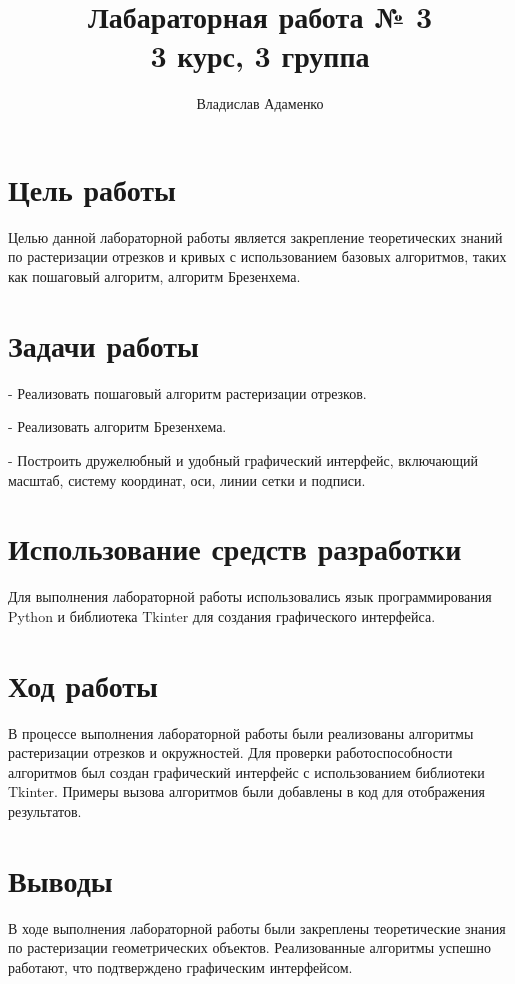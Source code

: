 \documentclass{article}
\begin{document}
    \title{Лабараторная работа № 3\\ 3 курс, 3 группа}
    \author{Владислав Адаменко}
    \maketitle

    \section{Цель работы}
    Целью данной лабораторной работы является закрепление теоретических знаний по растеризации отрезков и кривых с использованием базовых алгоритмов, таких как пошаговый алгоритм, алгоритм Брезенхема.

    \section{Задачи работы}
    - Реализовать пошаговый алгоритм растеризации отрезков.

    - Реализовать алгоритм Брезенхема.

    - Построить дружелюбный и удобный графический интерфейс, включающий масштаб, систему координат, оси, линии сетки и подписи.

    \section{Использование средств разработки}
    Для выполнения лабораторной работы использовались язык программирования Python и библиотека Tkinter для создания графического интерфейса.

    \section{Ход работы}
    В процессе выполнения лабораторной работы были реализованы алгоритмы растеризации отрезков и окружностей. Для проверки работоспособности алгоритмов был создан графический интерфейс с использованием библиотеки Tkinter. Примеры вызова алгоритмов были добавлены в код для отображения результатов.

    \section{Выводы}
    В ходе выполнения лабораторной работы были закреплены теоретические знания по растеризации геометрических объектов. Реализованные алгоритмы успешно работают, что подтверждено графическим интерфейсом.
\end{document}
